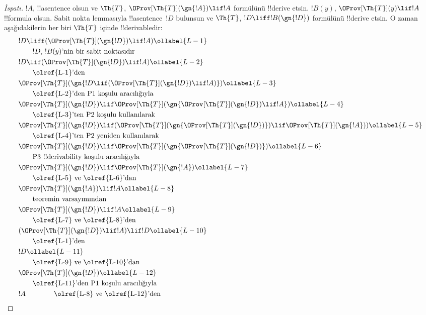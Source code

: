 \begin{proof}[ İspatı]
$!A$, !!a{sentence} olsun ve $\Th{T}$,
$\OProv[\Th{T}](\gn{!A}) \lif !A$ formülünü !!{derive} etsin. $!B(y)$,
$\OProv[\Th{T}](y) \lif !A$ !!{formula} olsun. Sabit nokta lemmasıyla
!!a{sentence}~$!D$ bulunsun ve $\Th{T}$, $!D \liff !B(\gn{!D})$
formülünü !!{derive} etsin.
O zaman aşağıdakilerin her biri $\Th{T}$ içinde !!{derivable}{}dir:
\begin{align}
  & !D \liff (\OProv[\Th{T}](\gn{!D}) \lif !A) \ollabel{L-1}\\
  & \qquad \text{$!D$, $!B(y)$'nin bir sabit noktasıdır}\notag \\
  & !D \lif (\OProv[\Th{T}](\gn{!D}) \lif !A) \ollabel{L-2}\\
  & \qquad\text{\olref{L-1}'den}\notag\\
  & \OProv[\Th{T}](\gn{!D \lif (\OProv[\Th{T}](\gn{!D}) \lif !A)}) \ollabel{L-3}\\
  & \qquad \text{\olref{L-2}'den P1 koşulu aracılığıyla}\notag \\
  & \OProv[\Th{T}](\gn{!D}) \lif \OProv[\Th{T}](\gn{\OProv[\Th{T}](\gn{!D}) \lif !A})
  \ollabel{L-4}\\
  &\qquad \text{\olref{L-3}'ten P2 koşulu kullanılarak}\notag \\
  & \OProv[\Th{T}](\gn{!D}) \lif (\OProv[\Th{T}](\gn{\OProv[\Th{T}](\gn{!D})}) \lif \OProv[\Th{T}](\gn{!A})) \ollabel{L-5}\\
  &\qquad \text{\olref{L-4}'ten P2 yeniden kullanılarak} \notag\\
& \OProv[\Th{T}](\gn{!D}) \lif \OProv[\Th{T}](\gn{\OProv[\Th{T}](\gn{!D})}) \ollabel{L-6}\\
  & \qquad\text{P3 !!{derivability} koşulu aracılığıyla} \notag\\
  & \OProv[\Th{T}](\gn{!D}) \lif \OProv[\Th{T}](\gn{!A}) \ollabel{L-7} \\
  &\qquad\text{\olref{L-5} ve \olref{L-6}'dan}\notag\\
  & \OProv[\Th{T}](\gn{!A}) \lif !A \ollabel{L-8}\\
  &\qquad\text{teoremin varsayımından} \notag\\
  & \OProv[\Th{T}](\gn{!D}) \lif !A \ollabel{L-9}\\
  &\qquad\text{\olref{L-7} ve \olref{L-8}'den}\notag\\
  & (\OProv[\Th{T}](\gn{!D}) \lif !A) \lif !D \ollabel{L-10}\\
  & \qquad \text{\olref{L-1}'den}\notag \\
  & !D \ollabel{L-11}\\
  & \qquad\text{\olref{L-9} ve \olref{L-10}'dan}\notag \\
  & \OProv[\Th{T}](\gn{!D}) \ollabel{L-12}\\
  & \qquad\text{\olref{L-11}'den P1 koşulu aracılığıyla}\notag \\
  & !A \qquad\qquad\text{\olref{L-8} ve \olref{L-12}'den}\notag
\end{align}
\end{proof}

